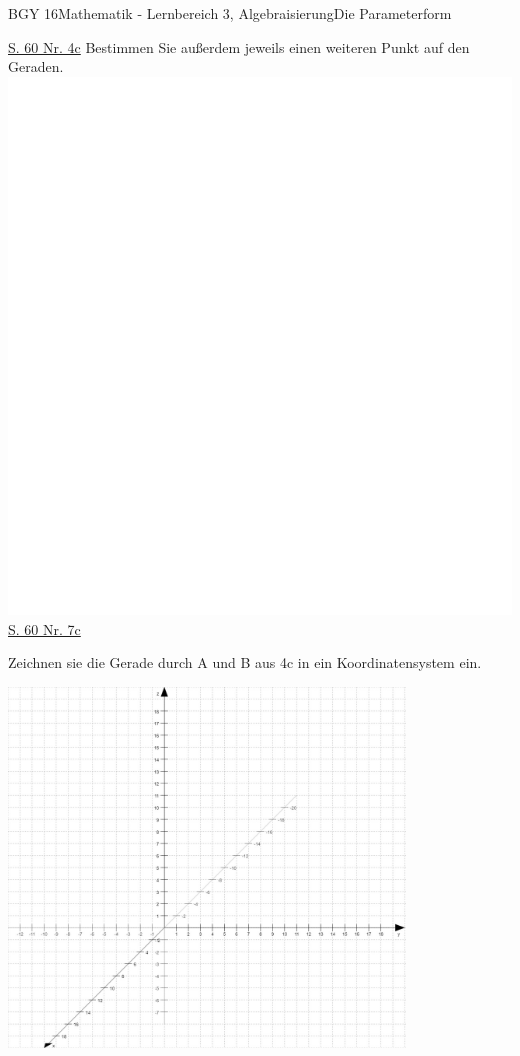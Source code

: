 \documentclass[oneside,openany,headings=optiontotoc,11pt,numbers=noenddot]{scrreprt}
\begin{document}
\begin{worksheet}{BGY 16}{Mathematik - Lernbereich 3, Algebraisierung}{Die Parameterform}
		\begin{framed}
			\noindent
			\underline{S. 60 Nr. 4c} Bestimmen Sie außerdem jeweils einen weiteren Punkt auf den Geraden.\\
			\includegraphics[scale=0.56]{../empty.jpg}\\
			\underline{S. 60  Nr. 7c}
		\end{framed}
		\begin{framed}
			\noindent
			Zeichnen sie die Gerade durch A und B aus 4c in ein Koordinatensystem ein.\\
			\begin{center}
				\includegraphics[width=0.79\textwidth]{Bilder/Koord3D.jpg}\\
			\end{center}
		\end{framed}
	\end{worksheet}
\end{document}
